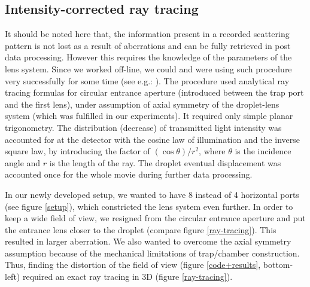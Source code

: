\documentclass[preprint,review,12pt,dvips]{elsarticle}
\begin{document}
\subsection{Intensity-corrected ray tracing}
It should be noted here that, the information present in a recorded scattering pattern is not lost as a result of
aberrations and can be fully retrieved in post data processing. However this requires the knowledge of the parameters of
the lens system. Since we worked off-line, we could and were using such procedure very successfully for some time (see
e.g.: \cite{RoP,weightvsscatt,Hi-precission,HK-soft_matter}). The procedure used analytical ray tracing formulas for
circular entrance aperture (introduced between the trap port and the first lens), under assumption of axial symmetry of
the droplet-lens system (which was fulfilled in our experiments). It required only simple planar trigonometry. The
distribution (decrease) of transmitted light intensity was accounted for at the detector with the cosine law of
illumination and the inverse square law, by introducing the factor of $(\cos \theta) /r^2$, where $\theta$ is the
incidence angle and $r$ is the length of the ray. The droplet eventual displacement was accounted once for the whole movie
during further data processing.

In our newly developed setup, we wanted to have 8 instead of 4 horizontal ports (see figure \ref{setup}), which
constricted the lens system even further. In order to keep a wide field of view, we resigned from the circular entrance
aperture and put the entrance lens closer to the droplet (compare figure \ref{ray-tracing}). This resulted in larger
aberration. We also wanted to overcome the axial symmetry assumption because of the mechanical limitations of trap/chamber
construction. Thus, finding the distortion of the field of view (figure \ref{code+results}, bottom-left) required an exact
ray tracing in 3D (figure \ref{ray-tracing}).
\end{document}
